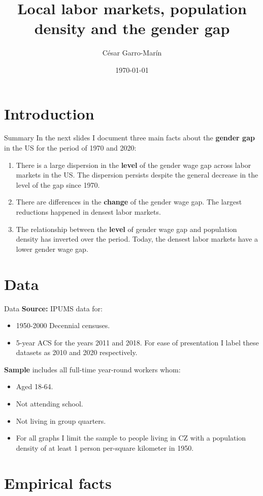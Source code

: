 \documentclass[10pt]{beamer}
\title{Local labor markets, population density and the gender gap}
\date{\today}
\author{C\'esar Garro-Mar\'in}
\institute{Boston University}
\newcommand{\bitem}{\begin{itemize}}
\newcommand{\eitem}{\end{itemize}}
\newcommand{\benu}{\begin{enumerate}}
\newcommand{\eenu}{\end{enumerate}}
\begin{document}
\maketitle

\section{Introduction}
\begin{frame}{Summary} 
	In the next slides I document three main facts about the \alert{\textbf{gender gap}} in the US for the period of 1970 and 2020:
	\benu
		\item There is a large dispersion in the \textbf{\alert{level}} of the gender wage gap across labor markets in the US. The dispersion persists despite the general decrease in the level of the gap since 1970.
		\item There are differences in the \textbf{\alert{change}} of the gender wage gap. The largest reductions happened in densest labor markets.
		\item The relationship between the \textbf{\alert{level}} of gender wage gap and population density has inverted over the period. Today, the densest labor markets have a lower gender wage gap.
	\eenu
\end{frame}

\section{Data}
\begin{frame}{Data}
	\textbf{\alert{Source:}} IPUMS data for:
		\bitem 
		\item 1950-2000 Decennial censuses.
		\item 5-year ACS for the years 2011 and 2018. For ease of presentation I label these datasets as 2010 and 2020 respectively.
	\eitem
	\textbf{\alert{Sample}} includes all full-time year-round workers whom:
	\bitem
		\item Aged 18-64.
		\item Not attending school.
		\item Not living in group quarters.
		\item For all graphs I limit the sample to people living in CZ with a population density of at least 1 person per-square kilometer in 1950.
	\eitem
\end{frame}
\section{Empirical facts}

\end{document}
